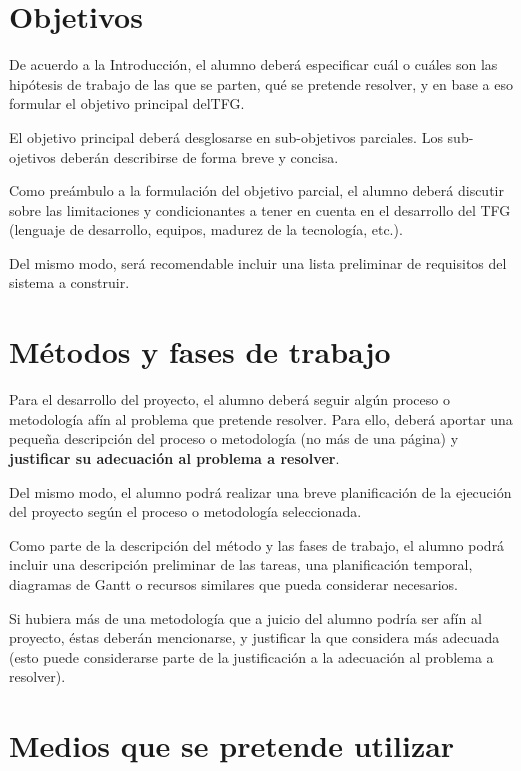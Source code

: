 \documentclass[11pt,a4paper,twoside,final]{article}
\begin{document}
\section{Objetivos}
De acuerdo a la Introducción, el alumno deberá especificar cuál o cuáles son las hipótesis de trabajo de las que se parten, qué se pretende resolver, y en base a eso formular el objetivo principal delTFG.

El objetivo principal deberá desglosarse en sub-objetivos parciales. Los sub-ojetivos deberán describirse de forma breve y concisa.

Como preámbulo a la formulación del objetivo parcial, el alumno deberá discutir sobre las limitaciones y condicionantes a tener en cuenta en el desarrollo del TFG (lenguaje de desarrollo, equipos, madurez de la tecnología, etc.).

Del mismo modo, será recomendable incluir una lista preliminar de requisitos del sistema a construir.






\section{Métodos y fases de trabajo}
Para el desarrollo del proyecto, el alumno deberá seguir algún proceso o metodología afín al problema que pretende resolver. Para ello, deberá aportar una pequeña descripción del proceso o metodología (no más de una página) y \textbf{justificar su adecuación al problema a resolver}.

Del mismo modo, el alumno podrá realizar una breve planificación de la ejecución del proyecto según el proceso o metodología seleccionada.

Como parte de la descripción del método y las fases de trabajo, el alumno podrá incluir una descripción preliminar de las tareas, una planificación temporal, diagramas de Gantt o recursos similares que pueda considerar necesarios.

Si hubiera más de una metodología que a juicio del alumno podría ser afín al proyecto, éstas deberán mencionarse, y justificar la que considera más adecuada (esto puede considerarse parte de la justificación a la adecuación al problema a resolver).








\section{Medios que se pretende utilizar}
\end{document}
